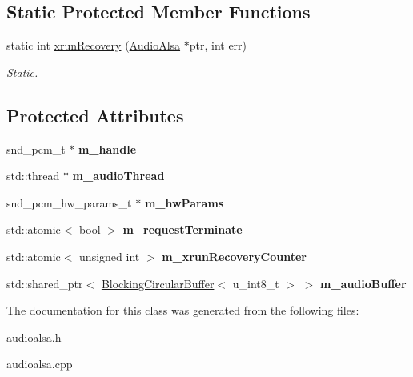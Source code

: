 \subsection*{Static Protected Member Functions}
\begin{DoxyCompactItemize}
\item 
\hypertarget{classNl_1_1AudioAlsa_a3bfd0415c0694893adda600459e54d2e}{}static int \hyperlink{classNl_1_1AudioAlsa_a3bfd0415c0694893adda600459e54d2e}{xrun\+Recovery} (\hyperlink{classNl_1_1AudioAlsa}{Audio\+Alsa} $\ast$ptr, int err)\label{classNl_1_1AudioAlsa_a3bfd0415c0694893adda600459e54d2e}

\begin{DoxyCompactList}\small\item\em Static. \end{DoxyCompactList}\end{DoxyCompactItemize}
\subsection*{Protected Attributes}
\begin{DoxyCompactItemize}
\item 
\hypertarget{classNl_1_1AudioAlsa_a70f80e5c44e951342e09d068ab85c7ba}{}snd\+\_\+pcm\+\_\+t $\ast$ {\bfseries m\+\_\+handle}\label{classNl_1_1AudioAlsa_a70f80e5c44e951342e09d068ab85c7ba}

\item 
\hypertarget{classNl_1_1AudioAlsa_ad42539868b85e4ff8a4b16871023df19}{}std\+::thread $\ast$ {\bfseries m\+\_\+audio\+Thread}\label{classNl_1_1AudioAlsa_ad42539868b85e4ff8a4b16871023df19}

\item 
\hypertarget{classNl_1_1AudioAlsa_a7511d35af0abe3d73b79c0e620a625cc}{}snd\+\_\+pcm\+\_\+hw\+\_\+params\+\_\+t $\ast$ {\bfseries m\+\_\+hw\+Params}\label{classNl_1_1AudioAlsa_a7511d35af0abe3d73b79c0e620a625cc}

\item 
\hypertarget{classNl_1_1AudioAlsa_aaa68b97a4c444118d668ef670047ba0f}{}std\+::atomic$<$ bool $>$ {\bfseries m\+\_\+request\+Terminate}\label{classNl_1_1AudioAlsa_aaa68b97a4c444118d668ef670047ba0f}

\item 
\hypertarget{classNl_1_1AudioAlsa_abdc14902d5b5b53baa2842e1a37cfc46}{}std\+::atomic$<$ unsigned int $>$ {\bfseries m\+\_\+xrun\+Recovery\+Counter}\label{classNl_1_1AudioAlsa_abdc14902d5b5b53baa2842e1a37cfc46}

\item 
\hypertarget{classNl_1_1AudioAlsa_adff181d43b67dbda1821144371c36526}{}std\+::shared\+\_\+ptr$<$ \hyperlink{classNl_1_1BlockingCircularBuffer}{Blocking\+Circular\+Buffer}$<$ u\+\_\+int8\+\_\+t $>$ $>$ {\bfseries m\+\_\+audio\+Buffer}\label{classNl_1_1AudioAlsa_adff181d43b67dbda1821144371c36526}

\end{DoxyCompactItemize}


The documentation for this class was generated from the following files\+:\begin{DoxyCompactItemize}
\item 
audioalsa.\+h\item 
audioalsa.\+cpp\end{DoxyCompactItemize}

